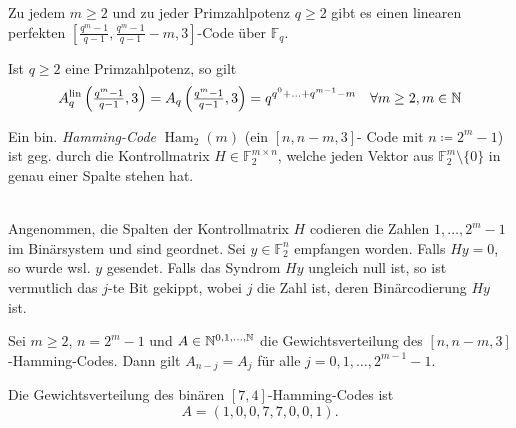\documentclass{cheat-sheet}
\newcommand{\F}{\mathbb{F}} %
\newcommand{\lin}{\text{lin}} %
\DeclareMathOperator{\Ham}{Ham} %
\begin{document}

\begin{satz}
  Zu jedem $m \geq 2$ und zu jeder Primzahlpotenz $q \geq 2$ gibt es einen linearen perfekten $[\tfrac{q^m - 1}{q - 1}, \tfrac{q^m - 1}{q - 1} - m, 3]$-Code über $\F_q$.
\end{satz}

\begin{kor}
  Ist $q \geq 2$ eine Primzahlpotenz, so gilt
  \[
    A^\lin_q \left( \tfrac{q^m - 1}{q - 1}, 3 \right) =
    A_q \left( \tfrac{q^m - 1}{q - 1}, 3 \right) =
    q^{q^0 + \ldots + q^{m-1} - m}
    \quad
    \forall m \geq 2, m \in \N
  \]
\end{kor}



\begin{konstr}
  Ein bin. \emph{Hamming-Code} $\Ham_2(m)$ (ein $[n, n {-} m, 3]$- Code mit $n \coloneqq 2^m - 1$) ist geg. durch die Kontrollmatrix $H \in \F_2^{m \times n}$, welche jeden Vektor aus $\F_2^m \setminus \{ 0 \}$ in genau einer Spalte stehen hat.
\end{konstr}

\begin{alg}\mbox{}\\
  Angenommen, die Spalten der Kontrollmatrix $H$ codieren die Zahlen $1, \ldots, 2^m - 1$ im Binärsystem und sind geordnet.
  Sei $y \in \F_2^n$ empfangen worden.
  Falls $Hy = 0$, so wurde wsl. $y$ gesendet.
  Falls das Syndrom $Hy$ ungleich null ist, so ist vermutlich das $j$-te Bit gekippt, wobei $j$ die Zahl ist, deren Binärcodierung $Hy$ ist.
\end{alg}


\begin{prop}
  Sei $m \geq 2$, $n = 2^m - 1$ und $A \in \mathbb{N}^{0, 1, \ldots, \mathbb{N}}$ die Gewichtsverteilung des $[n, n - m, 3]$-Hamming-Codes.
  Dann gilt $A_{n-j} = A_j$ für alle $j = 0, 1, \ldots, 2^{m-1} - 1$.
\end{prop}

\begin{satz}
  Die Gewichtsverteilung des binären $[7,4]$-Hamming-Codes ist
  \[ A = (1, 0, 0, 7, 7, 0, 0, 1). \]
\end{satz}
\end{document}
